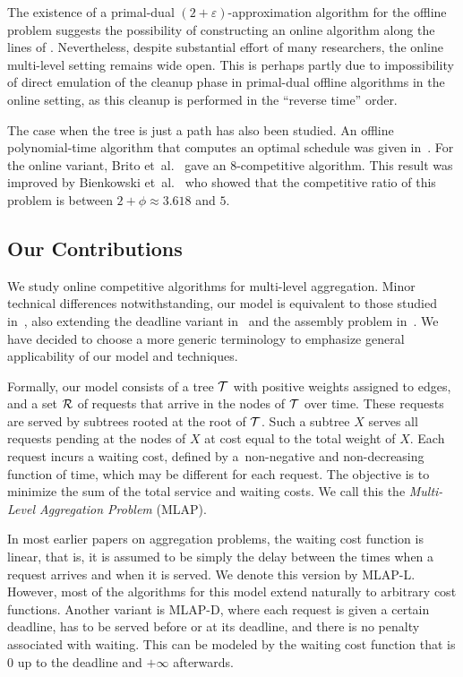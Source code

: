 \documentclass[a4paper]{article}
\newcommand{\etal}{et~al.}
\newcommand{\calR}{{\cal R}}
\newcommand{\calT}{{\cal T}}
\newcommand{\eps}{{\varepsilon}}
\newcommand{\MLAP}{\mbox{\rm\textsf{MLAP}}}
\newcommand{\MLAPL}{\mbox\rm{\textsf{MLAP-L}}}
\newcommand{\MLAPD}{\mbox{\rm\textsf{MLAP-D}}}
\begin{document}
The existence of a primal-dual $(2+\eps)$-approximation algorithm \cite{lehilton-note, jrp-levi-2-approx}
for the offline problem suggests the possibility of constructing an online algorithm along the lines of \cite{online-primal-dual-book}. Nevertheless, despite substantial effort of many researchers,
the online multi-level setting remains wide open.
This is perhaps partly due to impossibility of direct emulation of
the cleanup phase in primal-dual offline algorithms in the online setting, 
as this cleanup is performed in the ``reverse time'' order.

The case when the tree is just a path has also been studied.
An offline polynomial-time algorithm that computes an optimal schedule was given in~\cite{aggregation_wads_2013}.
For the online variant,
Brito {\etal}~\cite{aggregation-bkv} gave an $8$-competitive algorithm.
This result was improved by Bienkowski {\etal}~\cite{aggregation_wads_2013} who showed that
the competitive ratio of this problem is between $2+\phi\approx 3.618$ and $5$.


\subsection{Our Contributions}

We study online competitive algorithms for multi-level aggregation. Minor technical
differences notwithstanding, our model is equivalent to those studied
in~\cite{aggregation-bkv,khanna-message-aggregation}, also extending the
deadline variant in~\cite{packet-aggregation-becchetti} and the assembly
problem in~\cite{jrp-levi-2-approx}. We have decided to choose a more generic
terminology to emphasize general applicability of our model and techniques.

Formally, our model consists of a tree $\calT$ with positive weights assigned to edges,
and a set $\calR$ of requests that arrive in the nodes of $\calT$ over time. These
requests are served by subtrees rooted at the root of $\calT$. Such a
subtree $X$ serves all requests pending at the nodes of $X$ at cost equal to
the total weight of $X$. Each request incurs a waiting cost, defined by 
a~non-negative and non-decreasing function of time, which may be different for
each request. The objective is to minimize the sum of the total
service and waiting costs. We call this the \emph{Multi-Level Aggregation
Problem} ({\MLAP}).

In most earlier papers on aggregation problems, the waiting cost function is
linear, that is, it is
assumed to be simply the delay between the times when a request arrives and
when it is served. We denote this version by  {\MLAPL}.
However, most of the algorithms for this model extend naturally to arbitrary cost
functions.
Another variant is  {\MLAPD}, where each request is given a certain deadline,
has to be served before or at its deadline, and there is no penalty associated
with waiting. This can be modeled by the waiting cost function that is $0$ up to
the deadline and $+\infty$ afterwards.
\end{document}
